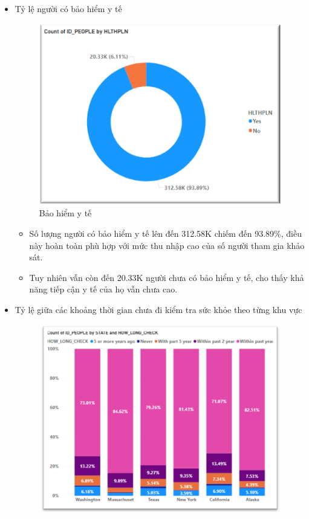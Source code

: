 \begin{itemize}[label=$-$]
\item Tỷ lệ người có bảo hiểm y tế
\begin{center}
            \begin{figure}[!h]
                \centering
                \includegraphics[scale = 0.9]{figures/Hoa/DE2.1.png} 
              \caption{Bảo hiểm y tế }
            \end{figure}
\end{center}
\begin{itemize}[label=$+$]
\item Số lượng người có bảo hiểm y tế lên đến 312.58K chiếm đến 93.89\%, điều này hoàn toàn phù hợp với mức thu nhập cao của số người tham gia khảo sát.
\item Tuy nhiên vẫn còn đến 20.33K người chưa có bảo hiểm y tế, cho thấy khả năng tiếp cận y tế của họ vẫn chưa cao.
\end{itemize}\newpage
\item Tỷ lệ giữa các khoảng thời gian chưa đi kiểm tra sức khỏe theo từng  khu vực
\begin{center}
            \begin{figure}[!h]
                \centering
                \includegraphics[scale = 0.8]{figures/Hoa/DE2.2.png} 

\end{figure}
\end{center}
\end{itemize}

